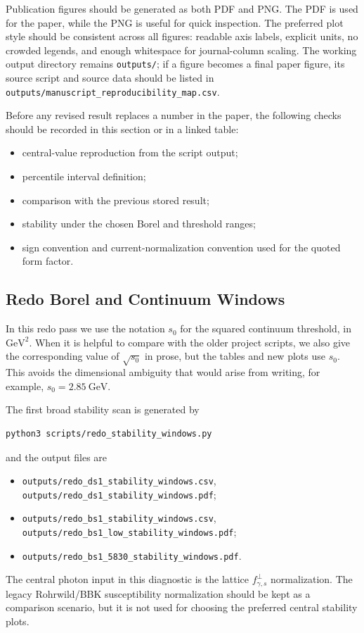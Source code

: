 \documentclass[11pt]{article}
\newcommand{\GeV}{\mathrm{GeV}}
\begin{document}
Publication figures should be generated as both PDF and PNG.  The PDF is used
for the paper, while the PNG is useful for quick inspection.  The preferred plot
style should be consistent across all figures: readable axis labels, explicit
units, no crowded legends, and enough whitespace for journal-column scaling.
The working output directory remains \texttt{outputs/}; if a figure becomes a
final paper figure, its source script and source data should be listed in
\texttt{outputs/manuscript\_reproducibility\_map.csv}.

Before any revised result replaces a number in the paper, the following checks
should be recorded in this section or in a linked table:
\begin{itemize}
  \item central-value reproduction from the script output;
  \item percentile interval definition;
  \item comparison with the previous stored result;
  \item stability under the chosen Borel and threshold ranges;
  \item sign convention and current-normalization convention used for the
  quoted form factor.
\end{itemize}

\subsection{Redo Borel and Continuum Windows}

In this redo pass we use the notation \(s_0\) for the squared continuum
threshold, in \(\GeV^2\).  When it is helpful to compare with the older project
scripts, we also give the corresponding value of \(\sqrt{s_0}\) in prose, but
the tables and new plots use \(s_0\).  This avoids the dimensional ambiguity
that would arise from writing, for example, \(s_0=2.85~\GeV\).

The first broad stability scan is generated by
\begin{verbatim}
python3 scripts/redo_stability_windows.py
\end{verbatim}
and the output files are
\begin{itemize}
  \item \texttt{outputs/redo\_ds1\_stability\_windows.csv},
  \texttt{outputs/redo\_ds1\_stability\_windows.pdf};
  \item \texttt{outputs/redo\_bs1\_stability\_windows.csv},
  \texttt{outputs/redo\_bs1\_low\_stability\_windows.pdf};
  \item \texttt{outputs/redo\_bs1\_5830\_stability\_windows.pdf}.
\end{itemize}
The central photon input in this diagnostic is the lattice
\(f_{\gamma,s}^{\perp}\) normalization.  The legacy Rohrwild/BBK
susceptibility normalization should be kept as a comparison scenario, but it is
not used for choosing the preferred central stability plots.
\end{document}

